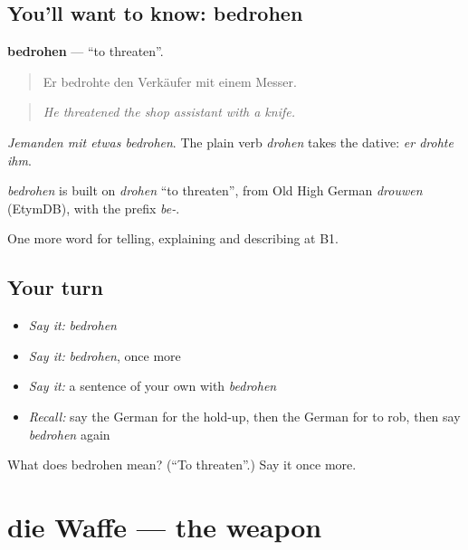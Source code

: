 \subsection*{You'll want to know: bedrohen}
\textbf{bedrohen} — \textquotedblleft{}to threaten\textquotedblright{}.

\begin{quote}
Er bedrohte den Verkäufer mit einem Messer.
\end{quote}

\begin{quote}
\emph{He threatened the shop assistant with a knife.}
\end{quote}

\emph{Jemanden mit etwas bedrohen}. The plain verb \emph{drohen} takes the dative: \emph{er drohte ihm}.

\begin{cousinweb}
\emph{bedrohen} is built on \emph{drohen} \textquotedblleft{}to threaten\textquotedblright{}, from Old High German \emph{drouwen} (EtymDB), with the prefix \emph{be-}.
\end{cousinweb}

\begin{grammarlens}[title={What you've built}]
One more word for telling, explaining and describing at B1.
\end{grammarlens}

\subsection*{Your turn}
\begin{itemize}
\raggedright
  \item \emph{Say it:} \emph{bedrohen}
  \item \emph{Say it:} \emph{bedrohen}, once more
  \item \emph{Say it:} a sentence of your own with \emph{bedrohen}
  \item \emph{Recall:} say the German for the hold-up, then the German for to rob, then say \emph{bedrohen} again
\end{itemize}

\begin{tcolorbox}[breakable,colback=teal!4,colframe=teal!35!black,title={Before you move on}]
What does bedrohen mean? (\textquotedblleft{}To threaten\textquotedblright{}.) Say it once more.
\end{tcolorbox}
\section[die Waffe]{die Waffe — the weapon}

